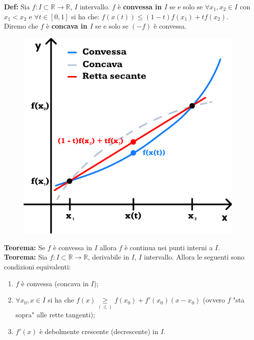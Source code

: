 \documentclass{article}
\begin{document}
\noindent\textbf{Def:} Sia $f: I \subset \mathbb{R} \xrightarrow{} \mathbb{R}$, $I$ intervallo. $f$ è \textbf{convessa in $I$} se e solo se $\forall x_1, x_2 \in I$ con $x_1 < x_2$ e $\forall t \in [0, 1]$ si ha che: $f(x(t)) \leq (1 - t)f(x_1) + tf(x_2)$.\\
Diremo che $f$ è \textbf{concava in $I$} se e solo se $(-f)$ è convessa.\\

\begin{figure}
\includegraphics[width=0.9\linewidth]{./images/convexity.pdf}
\end{figure}

\noindent\textbf{Teorema:} Se $f$ è convessa in $I$ allora $f$ è continua nei punti interni a $I$. \\

\noindent\textbf{Teorema:} Sia $f: I \subset \mathbb{R} \xrightarrow{} \mathbb{R}$, derivabile in $I$, $I$ intervallo. Allora le seguenti sono condizioni equivalenti:
\begin{enumerate}[label=\alph*)]
    \item $f$ è convessa (concava in $I$); 
    \item $\forall x_0, x \in I$ si ha che $f(x) \underset{(\leq)}{\geq} f(x_0) + f'(x_0)(x - x_0)$ (ovvero $f$ "sta sopra" alle rette tangenti);
    \item $f'(x)$ è debolmente crescente (decrescente) in $I$.
\end{enumerate}
\end{document}
